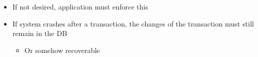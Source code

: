 \begin{itemize}
\begin{itemize}
                \begin{itemize}
                    \item If not desired, application must enforce this
                \end{itemize}
        \end{itemize}
        \begin{itemize}
            \item If system crashes after a transaction, the changes of the transaction must still remain in the DB
                \begin{itemize}
                    \item Or somehow recoverable
                \end{itemize}
        \end{itemize}
\end{itemize}


